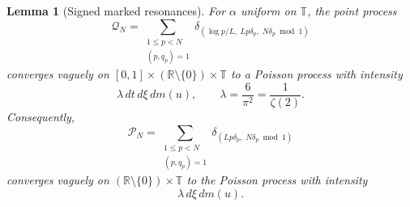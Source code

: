 \documentclass[11pt]{article}
\numberwithin{equation}{section}
\newtheorem{lemma}[theorem]{Lemma}
\theoremstyle{definition}
\newcommand{\T}{\mathbb T}
\newcommand{\R}{\mathbb R}
\newcommand{\1}{\mathbf 1}
\begin{document}
\begin{lemma}[Signed marked resonances]\label{lem:marked-poisson}
For \(\alpha\) uniform on \(\T\), the point process
\begin{equation}\label{eq:point-process-time}
 \mathcal Q_N=
 \sum_{\substack{1\le p<N\\(p,q_p)=1}}
 \delta_{\left(\log p/L,\;Lp\delta_p,\;N\delta_p\bmod1\right)}
\end{equation}
converges vaguely on
\([0,1]\times(\R\setminus\{0\})\times\T\) to a Poisson process with
intensity
\begin{equation}\label{eq:PPP-intensity-time}
 \lambda\,dt\,d\xi\,dm(u),\qquad
 \lambda=\frac6{\pi^2}=\frac1{\zeta(2)}.
\end{equation}
Consequently,
\begin{equation}\label{eq:point-process}
 \mathcal P_N=
 \sum_{\substack{1\le p<N\\(p,q_p)=1}}
 \delta_{\left(Lp\delta_p,\;N\delta_p\bmod1\right)}
\end{equation}
converges vaguely on
\((\R\setminus\{0\})\times\T\) to the Poisson process with intensity
\begin{equation}\label{eq:PPP-intensity}
 \lambda\,d\xi\,dm(u).
\end{equation}
\end{lemma}
\end{document}
